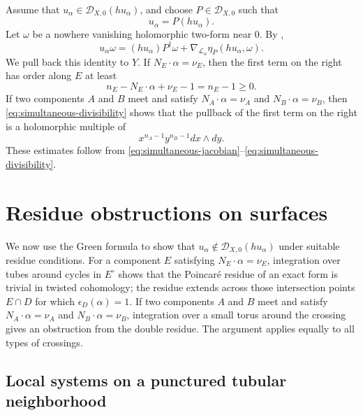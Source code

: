 \documentclass[12pt]{amsart}
\numberwithin{equation}{section}
\theoremstyle{plain}
\theoremstyle{definition}
\theoremstyle{remark}
\theoremstyle{definition}
\newcommand{\D}{\mathscr D}
\newcommand{\Lcal}{\mathscr L}
\begin{document}
Assume that $u_\alpha\in\D_{X,0}(hu_\alpha)$, and choose $P\in\D_{X,0}$ such that
\begin{equation}\label{eq:cyclic-containment-operator}
u_\alpha=P(hu_\alpha).
\end{equation}
Let $\omega$ be a nowhere vanishing holomorphic two-form near $0$. By ,
\begin{equation}\label{eq:green-cyclic-identity}
u_\alpha\omega=(hu_\alpha)P^\dagger\omega+\nabla_{\Lcal_\alpha}\eta_P(hu_\alpha,\omega).
\end{equation}
We pull back this identity to $Y$. If $N_E\cdot\alpha=\nu_E$, then the first term on the right has order along $E$ at least
\begin{equation}\label{eq:one-component-green-order}
n_E-N_E\cdot\alpha+\nu_E-1=n_E-1\ge0.
\end{equation}
If two components $A$ and $B$ meet and satisfy $N_A\cdot\alpha=\nu_A$ and $N_B\cdot\alpha=\nu_B$, then \eqref{eq:simultaneous-divisibility} shows that the pullback of the first term on the right is a holomorphic multiple of
\begin{equation}\label{eq:two-component-green-order}
x^{n_A-1}y^{n_B-1}dx\wedge dy.
\end{equation}
These estimates follow from \eqref{eq:simultaneous-jacobian}--\eqref{eq:simultaneous-divisibility}.






\section{Residue obstructions on surfaces}\label{sec:residue-obstructions}

We now use the Green formula to show that $u_\alpha\notin\D_{X,0}(hu_\alpha)$ under suitable residue conditions. For a component $E$ satisfying $N_E\cdot\alpha=\nu_E$, integration over tubes around cycles in $E^\circ$ shows that the Poincar\'e residue of an exact form is trivial in twisted cohomology; the residue extends across those intersection points $E\cap D$ for which $\epsilon_D(\alpha)=1$. If two components $A$ and $B$ meet and satisfy $N_A\cdot\alpha=\nu_A$ and $N_B\cdot\alpha=\nu_B$, integration over a small torus around the crossing gives an obstruction from the double residue. The argument applies equally to all types of crossings.

\subsection{Local systems on a punctured tubular neighborhood}
\end{document}
